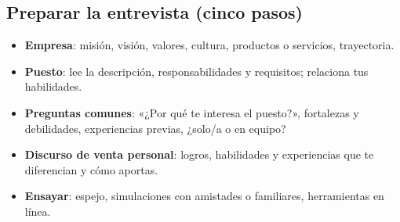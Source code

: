 \subsection{Preparar la entrevista (cinco pasos)}
\begin{center}
\end{center}
\begin{itemize}
\item \textbf{Empresa}: misión, visión, valores, cultura, productos o servicios, trayectoria.
\item \textbf{Puesto}: lee la descripción, responsabilidades y requisitos; relaciona tus habilidades.
\item \textbf{Preguntas comunes}: «¿Por qué te interesa el puesto?», fortalezas y debilidades, experiencias previas, ¿solo/a o en equipo?
\item \textbf{Discurso de venta personal}: logros, habilidades y experiencias que te diferencian y cómo aportas.
\item \textbf{Ensayar}: espejo, simulaciones con amistades o familiares, herramientas en línea.
\end{itemize}

